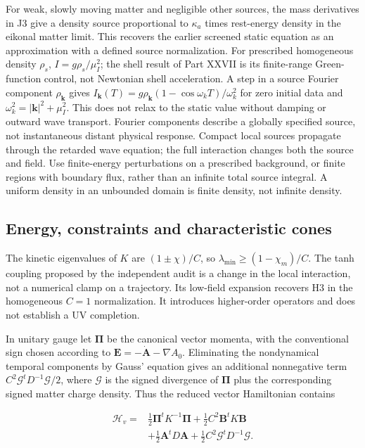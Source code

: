 \documentclass[
  11pt,
  twoside]{article}
\begin{document}
For weak, slowly moving matter and negligible other sources, the mass
derivatives in J3 give a density source proportional to \(\kappa_a\)
times rest-energy density in the eikonal matter limit. This recovers the
earlier screened static equation as an approximation with a defined
source normalization. For prescribed homogeneous density \(\rho_s\),
\(I=g\rho_s/\mu_I^2\); the shell result of Part XXVII is its
finite-range Green-function control, not Newtonian shell acceleration. A
step in a source Fourier component \(\rho_{\mathbf k}\) gives
\(I_{\mathbf k}(T)=g\rho_{\mathbf k}(1-\cos \omega_k T)/\omega_k^2\) for
zero initial data and \(\omega_k^2=|\mathbf k|^2+\mu_I^2\). This does
not relax to the static value without damping or outward wave transport.
Fourier components describe a globally specified source, not
instantaneous distant physical response. Compact local sources propagate
through the retarded wave equation; the full interaction changes both
the source and field. Use finite-energy perturbations on a prescribed
background, or finite regions with boundary flux, rather than an
infinite total source integral. A uniform density in an unbounded domain
is finite density, not infinite density.

\subsection{Energy, constraints and characteristic
cones}\label{energy-constraints-and-characteristic-cones}

The kinetic eigenvalues of \(K\) are \((1\pm\chi)/C\), so
\(\lambda_{\min}\geq(1-\chi_m)/C\). The tanh coupling proposed by the
independent audit is a change in the local interaction, not a numerical
clamp on a trajectory. Its low-field expansion recovers H3 in the
homogeneous \(C=1\) normalization. It introduces higher-order operators
and does not establish a UV completion.

In unitary gauge let \(\mathbf\Pi\) be the canonical vector momenta,
with the conventional sign chosen according to
\(\mathbf E=-\dot{\mathbf A}-\nabla A_0\). Eliminating the nondynamical
temporal components by Gauss' equation gives an additional nonnegative
term \(C^2\mathcal G^tD^{-1}\mathcal G/2\), where \(\mathcal G\) is the
signed divergence of \(\mathbf\Pi\) plus the corresponding signed matter
charge density. Thus the reduced vector Hamiltonian contains

\[\begin{aligned}
\mathcal H_v={}&\tfrac12\mathbf\Pi^tK^{-1}\mathbf\Pi
+\tfrac12 C^2\mathbf B^tK\mathbf B\\
&+\tfrac12\mathbf A^tD\mathbf A
+\tfrac12 C^2\mathcal G^tD^{-1}\mathcal G.
\end{aligned}\tag{J4}\]
\end{document}
